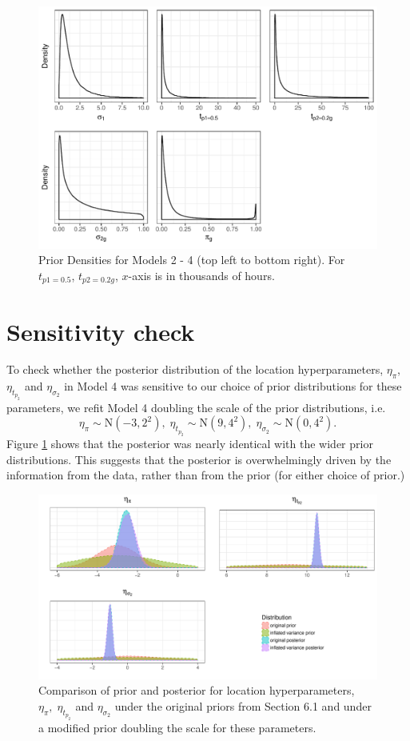 \documentclass[12pt]{article}
\begin{document}
\begin{figure}[H]
\center
\includegraphics[width=\textwidth]{priormod234.pdf}
\caption{Prior Densities for Models 2 - 4 (top left to bottom right). For $t_{p1 = 0.5}$, $t_{p2 = 0.2g}$, $x$-axis is in thousands of hours.}
\end{figure}

\section{Sensitivity check}
To check whether the posterior distribution of the location hyperparameters, $\eta_\pi$, $\eta_{t_{p_2}}$ and $\eta_{\sigma_2}$ in Model 4 was sensitive to our choice of prior distributions for these parameters, we refit Model 4 doubling the scale of the prior distributions, i.e.
$$\eta_\pi \sim \text{N}(-3,2^2),\; \eta_{t_{p_2}} \sim \text{N}(9,4^2),\; \eta_{\sigma_2} \sim \text{N}(0, 4^2).$$
Figure \ref{double_var} shows that the posterior was nearly identical with the wider prior distributions. This suggests that the posterior is overwhelmingly driven by the information from the data, rather than from the prior (for either choice of prior.)

\begin{figure}[H]
\center
\includegraphics[width=\textwidth]{double_var.pdf}
\caption{Comparison of prior and posterior for location hyperparameters, $\eta_\pi,\; \eta_{t_{p_2}}$ and $\eta_{\sigma_2}$ under the original priors from Section 6.1 and under a modified prior doubling the scale for these parameters.}
\label{double_var}
\end{figure}
\end{document}
